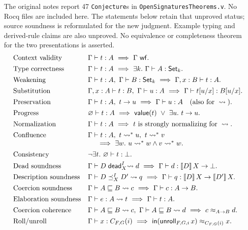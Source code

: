 \newpage
{}
The original notes report 47 \texttt{Conjecture}s in
\texttt{OpenSignaturesTheorems.v}. No Rocq files are included here.
The statements below retain that unproved status; source soundness is
reformulated for the new judgment. Example typing and derived-rule claims
are also unproved. No equivalence or completeness theorem for the two
presentations is asserted.
\[
\begin{array}{@{}ll@{}}
 \text{Context validity}&
 \Gamma\vdash t:A\ \Longrightarrow\ \Gamma\ \op{wf}.\\[4pt]
 \text{Type correctness}&
 \Gamma\vdash t:A\ \Longrightarrow\ \exists k.\ \Gamma\vdash A:\Set_k.\\[4pt]
 \text{Weakening}&
 \Gamma\vdash t:A,\ \Gamma\vdash B:\Set_k
 \ \Longrightarrow\ \Gamma,x:B\vdash t:A.\\[4pt]
 \text{Substitution}&
 \Gamma,x:A\vdash t:B,\ \Gamma\vdash u:A
 \ \Longrightarrow\ \Gamma\vdash t[u/x]:B[u/x].\\[4pt]
 \text{Preservation}&
 \Gamma\vdash t:A,\ t\to u
 \ \Longrightarrow\ \Gamma\vdash u:A
 \quad\text{(also for }\leadsto\text{).}\\[4pt]
 \text{Progress}&
 \varnothing\vdash t:A
 \ \Longrightarrow\ \op{value}(t)\ \lor\ \exists u.\ t\to u.\\[4pt]
 \text{Normalization}&
 \Gamma\vdash t:A\ \Longrightarrow\ t\text{ is strongly normalizing for }\leadsto.\\[4pt]
 \text{Confluence}&
 \Gamma\vdash t:A,\ t\leadsto^*u,\ t\leadsto^*v\\
 &\hspace{6mm}\Longrightarrow\ \exists w.\ u\leadsto^*w\land v\leadsto^*w.\\[4pt]
 \text{Consistency}&
 \neg\exists t.\ \varnothing\vdash t:\bot.\\[4pt]
 \text{Dead soundness}&
 \dead{D}{X}{d}\ \Longrightarrow\ \Gamma\vdash d:\interp{D}{X}\to\bot.\\[4pt]
 \text{Description soundness}&
 \dsub{D}{D'}{X}{q}\ \Longrightarrow\
 \Gamma\vdash q:\interp{D}{X}\to\interp{D'}{X}.\\[4pt]
 \text{Coercion soundness}&
 \subt{A}{B}{c}\ \Longrightarrow\ \Gamma\vdash c:A\to B.\\[4pt]
 \text{Elaboration soundness}&
 \elab{e}{A}{t}\ \Longrightarrow\ \Gamma\vdash t:A.\\[4pt]
 \text{Coercion coherence}&
 \subt{A}{B}{c},\ \subt{A}{B}{d}
 \ \Longrightarrow\ c\approx_{A\to B}d.\\[4pt]
 \text{Roll/unroll}&
 \Gamma\vdash x:C_{F,G}(i)
 \ \Longrightarrow\ \roll(\unroll_{F,G,i}\,x)\approx_{C_{F,G}(i)}x.
\end{array}
\]
